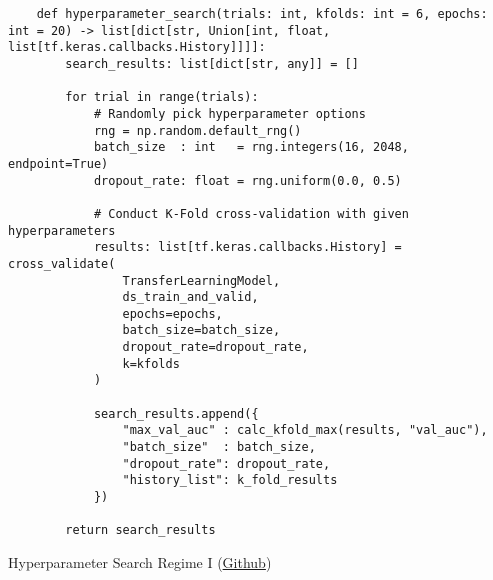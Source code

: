 \begin{listing}[H]
    \begin{verbatim}
    def hyperparameter_search(trials: int, kfolds: int = 6, epochs: int = 20) -> list[dict[str, Union[int, float, list[tf.keras.callbacks.History]]]]:
        search_results: list[dict[str, any]] = []

        for trial in range(trials):
            # Randomly pick hyperparameter options
            rng = np.random.default_rng()
            batch_size  : int   = rng.integers(16, 2048, endpoint=True)
            dropout_rate: float = rng.uniform(0.0, 0.5)

            # Conduct K-Fold cross-validation with given hyperparameters
            results: list[tf.keras.callbacks.History] = cross_validate(
                TransferLearningModel,
                ds_train_and_valid,
                epochs=epochs,
                batch_size=batch_size,
                dropout_rate=dropout_rate,
                k=kfolds
            )

            search_results.append({
                "max_val_auc" : calc_kfold_max(results, "val_auc"),
                "batch_size"  : batch_size,
                "dropout_rate": dropout_rate,
                "history_list": k_fold_results
            })

        return search_results
    \end{verbatim}
\caption{Hyperparameter Search Regime I (\href{https://github.com/ShenZhouHong/radiography-ai-project/blob/master/python/hyperparam-search/regime-1.ipynb}{Github})}\label{listing:hyperparam-search}
\end{listing}